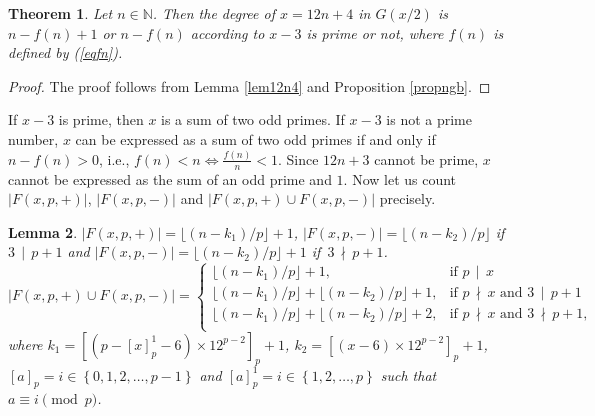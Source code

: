\documentclass[11pt]{article}
\newtheorem{theorem}{Theorem}[section]
\newtheorem{lemma}[theorem]{Lemma}
\theoremstyle{definition}
\theoremstyle{remark}
\numberwithin{equation}{section}
\newcommand{\Nat}{\mathbb{N}}
\newcommand{\set}[1]{\left\{#1\right\}}
\newcommand{\Mod}[3]{#1\equiv #2 \pmod{#3}}
\newcommand{\Div}[2]{#1\,\mid\, #2}
\newcommand{\nDiv}[2]{#1\,\nmid\, #2}
\begin{document}
\begin{theorem}\label{thm14}
Let $n\in\Nat$. Then the degree of $x=12n+4$ in $G(x/2)$ is $n-f(n)+1$ or $n-f(n)$ according to $x-3$ is prime or not, where $f(n)$ is defined by (\ref{eqfn}). 
\end{theorem}

\begin{proof}
The proof follows from Lemma \ref{lem12n4} and Proposition \ref{propngb}.
\end{proof}

\noindent
If $x-3$ is prime, then $x$ is a sum of two odd primes. If $x-3$ is not a prime number, $x$ can be expressed as a sum of two odd primes if and only if $n-f(n)>0$, i.e., $f(n)<n \Longleftrightarrow \frac{f(n)}{n}<1$. Since $12n+3$ cannot be prime, $x$ cannot be expressed as the sum of an odd prime and $1$. Now let us count $|F(x,p,+)|$, $|F(x,p,-)|$ and $|F(x,p,+)\cup F(x,p,-)|$ precisely.

\begin{lemma}\label{lemfp4}
$|F(x,p,+)|=\lfloor (n-k_1)/p\rfloor+1$, $|F(x,p,-)|=\lfloor (n-k_2)/p\rfloor $ if\ $\Div{3}{p+1}$ and $|F(x,p,-)|=\lfloor (n-k_2)/p\rfloor +1$ if\ $\nDiv{3}{p+1}$.  
$$|F(x,p,+)\cup F(x,p,-)|=\left\{\begin{array}{ll}
\lfloor (n-k_1)/p\rfloor+1, & \text{if } \Div{p}{x}\\
\lfloor (n-k_1)/p\rfloor + \lfloor (n-k_2)/p\rfloor +1, & \text{if } \nDiv{p}{x}\text{ and } \Div{3}{p+1}\\
\lfloor (n-k_1)/p\rfloor + \lfloor (n-k_2)/p\rfloor +2, & \text{if } \nDiv{p}{x}\text{ and } \nDiv{3}{p+1},\\
\end{array}\right.$$
where $k_1=[(p-[x]_p^1-6)\times 12^{p-2}]_p+1$, $k_2=[(x-6)\times 12^{p-2}]_p+1$, $[a]_p=i\in\set{0,1,2,\ldots,p-1}$ and $[a]_p^1=i\in\set{1,2,\ldots,p}$ such that $\Mod{a}{i}{p}$.
\end{lemma}
\end{document}
